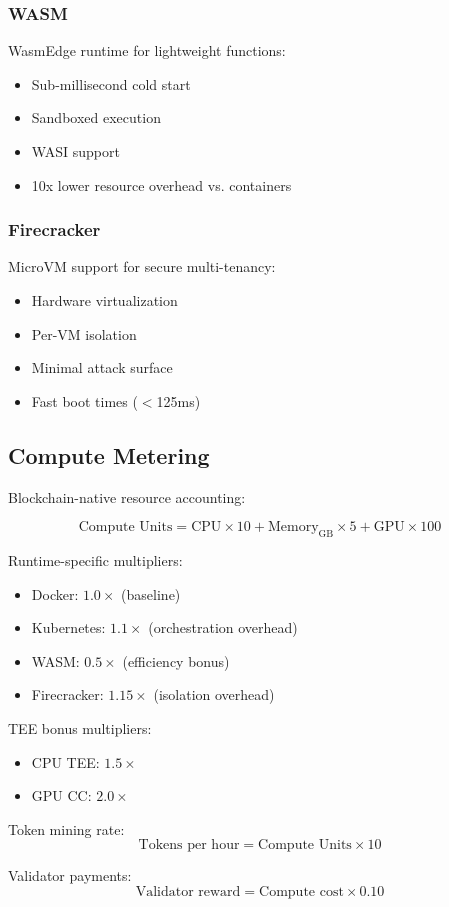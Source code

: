 \subsubsection{WASM}

WasmEdge runtime for lightweight functions:
\begin{itemize}
\item Sub-millisecond cold start
\item Sandboxed execution
\item WASI support
\item 10x lower resource overhead vs. containers
\end{itemize}

\subsubsection{Firecracker}

MicroVM support for secure multi-tenancy:
\begin{itemize}
\item Hardware virtualization
\item Per-VM isolation
\item Minimal attack surface
\item Fast boot times ($<$125ms)
\end{itemize}

\subsection{Compute Metering}

Blockchain-native resource accounting:

\begin{equation}
\text{Compute Units} = \text{CPU} \times 10 + \text{Memory}_{\text{GB}} \times 5 + \text{GPU} \times 100
\end{equation}

Runtime-specific multipliers:
\begin{itemize}
\item Docker: $1.0\times$ (baseline)
\item Kubernetes: $1.1\times$ (orchestration overhead)
\item WASM: $0.5\times$ (efficiency bonus)
\item Firecracker: $1.15\times$ (isolation overhead)
\end{itemize}

TEE bonus multipliers:
\begin{itemize}
\item CPU TEE: $1.5\times$
\item GPU CC: $2.0\times$
\end{itemize}

Token mining rate:
\begin{equation}
\text{Tokens per hour} = \text{Compute Units} \times 10
\end{equation}

Validator payments:
\begin{equation}
\text{Validator reward} = \text{Compute cost} \times 0.10
\end{equation}

